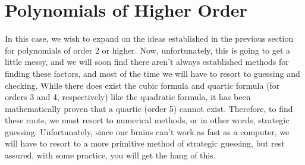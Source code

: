 \documentclass[11pt]{article}
\numberwithin{lemma}{section}
\numberwithin{equation}{section}
\numberwithin{define}{section}
\numberwithin{prop}{section}
\numberwithin{figure}{section}
\numberwithin{theorem}{section}
\numberwithin{cor}{section}
\newcounter{ex}[section]
\numberwithin{ex}{section}
\begin{document}
\section{Polynomials of Higher Order}
In this case, we wish to expand on the ideas established in the previous section for polynomials of order 2 or higher. 
Now, unfortunately, this is going to get a little messy, and we will soon find there aren't always established methods for finding these factors, and most of the time we will have to resort to guessing and checking. 
While there does exist the cubic formula and quartic formula (for orders 3 and 4, respectively) like the quadratic formula, it has been mathematically proven that a quartic (order 5) cannot exist.
Therefore, to find these roots, we must resort to numerical methods, or in other words, strategic guessing.
Unfortunately, since our brains can't work as fast as a computer, we will have to resort to a more primitive method of strategic guessing, but rest assured, with some practice, you will get the hang of this.
\end{document}
